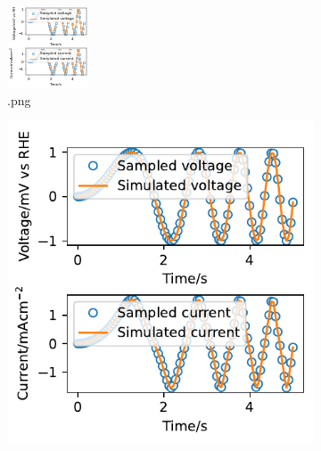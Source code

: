     \begin{figure}
        \begin{subfigure}[t]{0.32\textwidth}
        \includegraphics[width=\linewidth]{./figs/example_1.png}
        \caption{.png}
        \label{figures:fig:exmaple:2:a}
        \end{subfigure}
        \begin{subfigure}[t]{0.32\textwidth}
        \includegraphics[width=\linewidth]{./figs/example_1.pdf}

\end{subfigure}
\end{figure}
